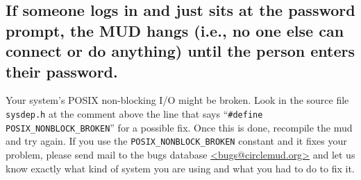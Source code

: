 \documentclass[11pt]{article}
\begin{document}
\subsection{If someone logs in and just sits at the password prompt, the MUD hangs (i.e., no one else can connect or do anything) until the person enters their password.}
Your system's POSIX non-blocking I/O might be broken.  Look in the source file \texttt{sysdep.h} at the comment above the line that says ``\texttt{\#define POSIX\_NONBLOCK\_BROKEN}'' for a possible fix. Once this is done, recompile the mud and try again.  If you use the \texttt{POSIX\_NONBLOCK\_BROKEN} constant and it fixes your problem, please send mail to the bugs database \url{<bugs@circlemud.org>} and let us know exactly what kind of system you are using and what you had to do to fix it. 
\end{document}
